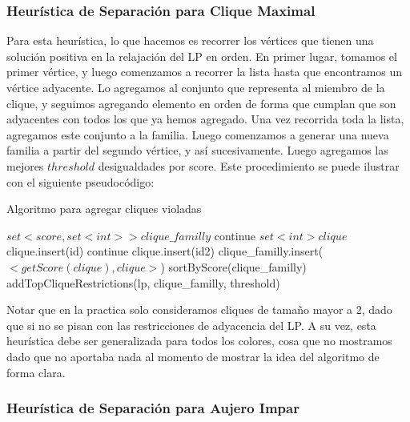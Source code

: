 \pagebreak

\subsubsection{Heurística de Separación para Clique Maximal}

Para esta heurística, lo que hacemos es recorrer los vértices que tienen una solución positiva en la relajación del LP en orden. En primer lugar, tomamos el primer vértice, y luego comenzamos a recorrer la lista hasta que encontramos un vértice adyacente. Lo agregamos al conjunto que representa al miembro de la clique, y seguimos agregando elemento en orden de forma que cumplan que son adyacentes con todos los que ya hemos agregado. Una vez recorrida toda la lista, agregamos este conjunto a la familia. Luego comenzamos a generar una nueva familia a partir del segundo vértice, y así sucesivamente. Luego agregamos las mejores $threshold$ desigualdades por score. Este procedimiento se puede ilustrar con el siguiente pseudocódigo:

\begin{algorithm}
\caption{Algoritmo para agregar cliques violadas}
\begin{algorithmic}[1]
\State $set<score, set<int>> clique\_familly$
		\State continue
	\EndIf
	\State $set<int> clique$
	\State clique.insert(id)
			\State continue
		\EndIf
			\State clique.insert(id2)
		\EndIf
	\EndFor
		\State clique\_familly.insert($<getScore(clique), clique>$)
	\EndIf
\EndFor
\State sortByScore(clique\_familly)
\State addTopCliqueRestrictions(lp, clique\_familly, threshold)
\EndProcedure
\end{algorithmic}
\end{algorithm}

Notar que en la practica solo consideramos cliques de tamaño mayor a 2, dado que si no se pisan con las restricciones de adyacencia del LP. A su vez, esta heurística debe ser generalizada para todos los colores, cosa que no mostramos dado que no aportaba nada al momento de mostrar la idea del algoritmo de forma clara.

\pagebreak

\subsubsection{Heurística de Separación para Aujero Impar}

